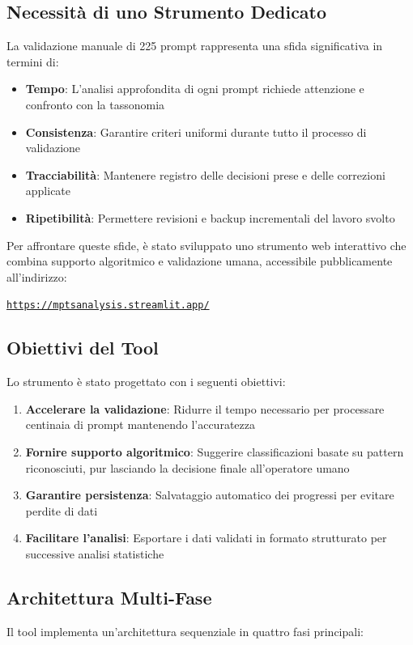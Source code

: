 \documentclass[a4paper,12pt]{article}
\begin{document}
\subsection{Necessità di uno Strumento Dedicato}
La validazione manuale di 225 prompt rappresenta una sfida significativa in termini di:
\begin{itemize}
    \item \textbf{Tempo}: L'analisi approfondita di ogni prompt richiede attenzione e confronto con la tassonomia
    \item \textbf{Consistenza}: Garantire criteri uniformi durante tutto il processo di validazione
    \item \textbf{Tracciabilità}: Mantenere registro delle decisioni prese e delle correzioni applicate
    \item \textbf{Ripetibilità}: Permettere revisioni e backup incrementali del lavoro svolto
\end{itemize}

Per affrontare queste sfide, è stato sviluppato uno strumento web interattivo che combina supporto algoritmico e validazione umana, accessibile pubblicamente all'indirizzo:

\begin{center}
\href{https://mptsanalysis.streamlit.app/}{\texttt{https://mptsanalysis.streamlit.app/}}
\end{center}

\subsection{Obiettivi del Tool}
Lo strumento è stato progettato con i seguenti obiettivi:
\begin{enumerate}
    \item \textbf{Accelerare la validazione}: Ridurre il tempo necessario per processare centinaia di prompt mantenendo l'accuratezza
    \item \textbf{Fornire supporto algoritmico}: Suggerire classificazioni basate su pattern riconosciuti, pur lasciando la decisione finale all'operatore umano
    \item \textbf{Garantire persistenza}: Salvataggio automatico dei progressi per evitare perdite di dati
    \item \textbf{Facilitare l'analisi}: Esportare i dati validati in formato strutturato per successive analisi statistiche
\end{enumerate}

\subsection{Architettura Multi-Fase}
Il tool implementa un'architettura sequenziale in quattro fasi principali:
\end{document}
